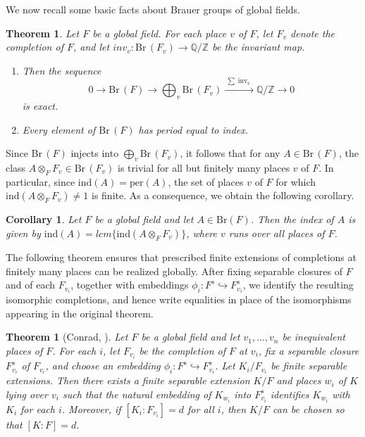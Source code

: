 \documentclass[10pt]{amsart}
\theoremstyle{plain}
\newtheorem{theorem}[thm]{Theorem}
\newtheorem{corollary}[thm]{Corollary}
\theoremstyle{definition}
\newcommand{\Br}{\text{Br}}
\begin{document}
We now recall some basic facts about Brauer groups of global fields. 
\begin{theorem}\cite[Theorem 1.5.36]{poonen2023rational}\label{ABHN}
Let \(F\) be a global field. For each place \(v\) of \(F\), let \(F_v\) denote the completion of \(F\), and let \(inv_v:\Br\,(F_v) \to \mathbb{Q}/\mathbb{Z}\) be the invariant map.

\begin{enumerate}
\item Then the sequence
\[
0 \longrightarrow \Br \,(F) \longrightarrow \bigoplus_{v} \Br \,(F_v)
\xrightarrow{\ \sum \operatorname{inv}_v\ } \mathbb{Q}/\mathbb{Z} \longrightarrow 0
\]
is exact.
\item Every element of \(\Br\, (F)\) has period equal to index.
\end{enumerate}
\end{theorem}
Since \(\Br\,(F)\) injects into \(\bigoplus_{v} \Br \, (F_v)\), it follows that for any \(A \in \Br \, (F)\), the class \(A \otimes_F F_v \in \Br \, (F_v)\) is trivial for all but finitely many places \(v\) of \(F\). In particular, since \(\mathrm{ind}(A)=\mathrm{per}(A)\), the set of places \(v\) of \(F\) for which \(\mathrm{ind}(A \otimes_F F_v) \neq 1\) is finite.
As a consequence, we obtain the following corollary.
\begin{corollary}\cite[Corollary 18.6]{pierce2012associative}\label{global index is lcm of local}
Let \(F\) be a global field and let \(A \in \Br(F)\). Then the index of \(A\) is given by \(\mathrm{ind}(A) = lcm\{\mathrm{ind}(A \otimes_F F_v)\}\), where \(v\) runs over all places of \(F\).
\end{corollary}


The following theorem ensures that prescribed finite extensions of completions at finitely many places can be realized globally. After fixing separable closures of \(F\) and of each \(F_{v_i}\), together with embeddings \(\phi_i : F^s \hookrightarrow F_{v_i}^s\), we identify the resulting isomorphic completions, and hence write equalities in place of the isomorphisms appearing in the original theorem.

\begin{theorem}[Conrad, \cite{ConradLocalGlobal}]\label{Conrad}
Let \(F\) be a global field and let \(v_1,\dots,v_n\) be inequivalent places of \(F\). For each \(i\), let \(F_{v_i}\) be the completion of \(F\) at \(v_i\), fix a separable closure \(F_{v_i}^s\) of \(F_{v_i}\), and choose an embedding \(\phi_i : F^s \hookrightarrow F_{v_i}^s\). Let \(K_i/F_{v_i}\) be finite separable extensions. Then there exists a finite separable extension \(K/F\) and places \(w_i\) of \(K\) lying over \(v_i\) such that the natural embedding of \(K_{w_i}\) into \(F_{v_i}^s\) identifies \(K_{w_i}\) with \(K_i\) for each \(i\). Moreover, if \([K_i : F_{v_i}] = d\) for all \(i\), then \(K/F\) can be chosen so that \([K : F] = d\).
\end{theorem}
\end{document}
